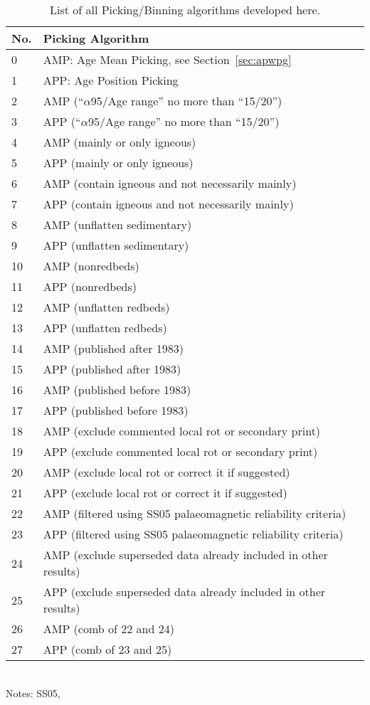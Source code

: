 \begin{table}
\centering
\caption{List of all Picking/Binning algorithms developed here.}\label{tab-pick}
\begin{tabular}{@{}ll@{}}
\toprule
No. & Picking Algorithm \\ \midrule
0 & AMP\@: Age Mean Picking, see Section~\ref{sec:apwpg} \\
1 & APP\@: Age Position Picking \\
2 & AMP (``$\alpha$95/Age range'' no more than ``15/20'') \\
3 & APP (``$\alpha$95/Age range'' no more than ``15/20'') \\
4 & AMP (mainly or only igneous) \\
5 & APP (mainly or only igneous) \\
6 & AMP (contain igneous and not necessarily mainly) \\
7 & APP (contain igneous and not necessarily mainly) \\
8 & AMP (unflatten sedimentary) \\
9 & APP (unflatten sedimentary) \\
10 & AMP (nonredbeds) \\
11 & APP (nonredbeds) \\
12 & AMP (unflatten redbeds) \\
13 & APP (unflatten redbeds) \\
14 & AMP (published after 1983) \\
15 & APP (published after 1983) \\
16 & AMP (published before 1983) \\
17 & APP (published before 1983) \\
18 & AMP (exclude commented local rot or secondary print) \\
19 & APP (exclude commented local rot or secondary print) \\
20 & AMP (exclude local rot or correct it if suggested) \\
21 & APP (exclude local rot or correct it if suggested) \\
22 & AMP (filtered using SS05 palaeomagnetic reliability criteria) \\
23 & APP (filtered using SS05 palaeomagnetic reliability criteria) \\
24 & AMP (exclude superseded data already included in other results) \\
25 & APP (exclude superseded data already included in other results) \\
26 & AMP (comb of 22 and 24) \\
27 & APP (comb of 23 and 25) \\ \bottomrule
\end{tabular}
\raggedright{\\Notes: SS05,~\citet{S05}}
\end{table}

